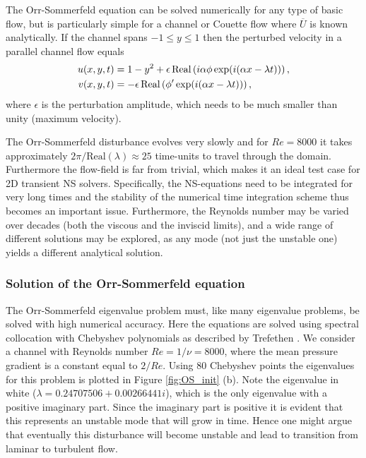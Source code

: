 The Orr-Sommerfeld equation can be solved numerically for any type of basic flow, but is particularly simple for a channel or Couette flow where $\overline{U}$ is known analytically. If the channel spans $-1\leq y \leq 1$ then the perturbed velocity in a parallel channel flow equals
\begin{align}
 u(x,y,t)&=1-y^2+\epsilon \,\text{Real}\left(i\alpha \phi \, \text{exp}(i(\alpha x-\lambda t))\right), \notag \\
 v(x,y,t)&=-\epsilon \, \text{Real}\left(\phi' \, \text{exp}(i(\alpha x-\lambda t))\right),
\label{eq:channel}
\end{align}
where $\epsilon$ is the perturbation amplitude, which needs to be much smaller than unity (maximum velocity).

The Orr-Sommerfeld disturbance evolves very slowly and for $Re=8000$ it takes approximately $2 \pi/\text{Real}(\lambda)\approx 25$ time-units to travel through the domain. Furthermore the flow-field is far from trivial, which makes it an ideal test case for 2D transient NS solvers. Specifically, the NS-equations need to be integrated for very long times and the stability of the numerical time integration scheme thus becomes an important issue. Furthermore, the Reynolds number may be varied over decades (both the viscous and the inviscid limits), and a wide range of different solutions may be explored, as any mode (not just the unstable one) yields a different analytical solution.

\subsubsection{Solution of the Orr-Sommerfeld equation}

The Orr-Sommerfeld eigenvalue problem must, like many eigenvalue problems, be solved with high numerical accuracy. Here the equations are solved using spectral collocation with Chebyshev polynomials as described by Trefethen \cite{tref06}. We consider a channel with Reynolds number $Re=1/\nu=8000$, where the mean pressure gradient is a constant equal to $2/Re$. Using 80 Chebyshev points the eigenvalues for this problem is plotted in Figure \ref{fig:OS_init} (b). Note the eigenvalue in white ($\lambda = 0.24707506+0.00266441 i$), which is the only eigenvalue with a positive imaginary part. Since the imaginary part is positive it is evident that this represents an unstable mode that will grow in time. Hence one might argue that eventually this disturbance will become unstable and lead to transition from laminar to turbulent flow.


